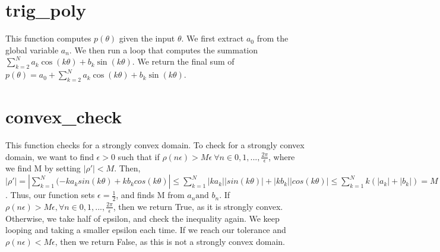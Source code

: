 \documentclass{article}
\begin{document}
\section*{trig\_poly}
This function computes $p(\theta)$ given the input $\theta$. We first extract $a_0$ from the global variable $a_n$. We then run a loop that computes the summation $\sum_{k=2}^{N} a_k \cos(k\theta) + b_k \sin(k\theta)$. We return the final sum of $p(\theta) = a_0 + \sum_{k=2}^{N} a_k \cos(k\theta) + b_k \sin(k\theta)$. 

\section*{convex\_check}
This function checks for a strongly convex domain. To check for a strongly convex domain, we want to find $\epsilon>0$ such that if $\rho (n\epsilon)>M\epsilon \: \forall n \in 0, 1, ..., \frac{2\pi}{\epsilon}$, where we find M by setting $|\rho'|<M$. Then, $|\rho'| = |\sum_{k=1}^N (-k a_k sin(k\theta)+k b_k cos(k\theta)| \leq \sum_{k=1}^N |k a_k||sin(k\theta)|+|k b_k||cos(k\theta)| \leq \sum_{k=1}^N k(|a_k|+|b_k|) = M$. Thus, our function sets $\epsilon = \frac{1}{2}$, and finds M from $a_n \text{and } b_n$. If $\rho(n\epsilon) > M\epsilon, \forall n \in 0, 1, ..., \frac{2\pi}{\epsilon}$, then we return True, as it is strongly convex. Otherwise, we take half of epsilon, and check the inequality again. We keep looping and taking a smaller epsilon each time. If we reach our tolerance and $\rho(n\epsilon) < M\epsilon$, then we return False, as this is not a strongly convex domain.

\newpage
\end{document}
